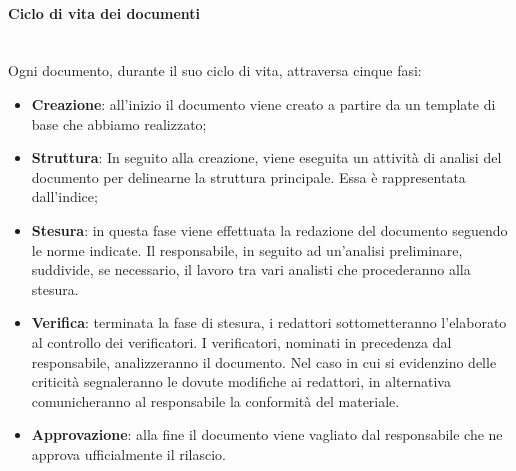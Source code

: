         \paragraph{Ciclo di vita dei documenti}\mbox{}\\ [1mm]
            Ogni documento, durante il suo ciclo di vita, attraversa cinque fasi:
            \begin{itemize}
            	\item \textbf{Creazione}: all'inizio il documento viene creato a partire da un template di base che abbiamo realizzato;
            	\item \textbf{Struttura}: In seguito alla creazione, viene eseguita un attività di analisi del documento per delinearne la struttura principale. Essa è rappresentata dall'indice;
                \item \textbf{Stesura}: in questa fase viene effettuata la redazione del documento seguendo le norme indicate. Il responsabile, in seguito ad un'analisi preliminare, suddivide, se necessario, il lavoro tra vari analisti che procederanno alla stesura.
                \item \textbf{Verifica}: terminata la fase di stesura, i redattori sottometteranno l'elaborato al controllo dei verificatori. I verificatori, 
                                         nominati in precedenza dal responsabile, analizzeranno il documento. Nel caso in cui si evidenzino delle criticità
                                         segnaleranno le dovute modifiche ai redattori, in alternativa comunicheranno al responsabile la conformità del materiale.
                \item \textbf{Approvazione}: alla fine il documento viene vagliato dal responsabile che ne approva ufficialmente il rilascio.
            \end{itemize}
